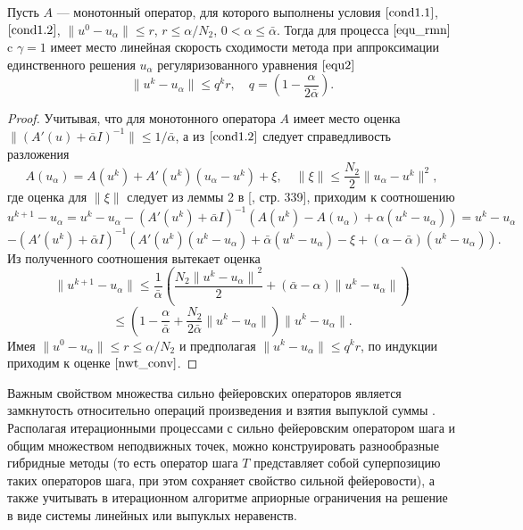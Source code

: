 \begin{theorem}\label{teo2.1} Пусть $A$ --- монотонный оператор, для которого выполнены условия $\eqref{cond1.1}$, $\eqref{cond1.2}$, $\|u^0-u_\alpha\| \le r$, $r\le \alpha/N_2$, $0<\alpha \le \bar\alpha$. Тогда для процесса $\eqref{equ_rmn}$ c $\gamma=1$ имеет место линейная скорость сходимости метода при аппроксимации единственного решения $u_\alpha$ регуляризованного уравнения $\eqref{equ2}$
	\begin{equation}\label{nwt_conv}
	\| u^k-u_\alpha \| \le q^kr, \quad q=(1-\frac{\alpha}{2\bar\alpha}).
	\end{equation}
\end{theorem}
\begin{proof} 
Учитывая, что для монотонного оператора $A$ имеет место оценка $\| (A'(u)+\bar\alpha I)^{-1} \| \le 1/\bar\alpha$, а из $\eqref{cond1.2}$ следует справедливость разложения
$$
A(u_\alpha)=A(u^k)+A'(u^k)(u_\alpha-u^k)+\xi, \quad \|\xi\|\le \frac{N_2}{2}\|u_\alpha-u^k\|^2,
$$
где оценка для $\|\xi\|$ следует из леммы 2 в [\cite{Tre1993}, стр. 339], приходим к соотношению 
$$
u^{k+1}-u_\alpha=u^k-u_\alpha-(A'(u^k)+\bar\alpha I)^{-1}(A(u^k)-A(u_\alpha)+\alpha(u^k-u_\alpha))=u^k- u_\alpha$$ $$-(A'(u^k)+\bar\alpha I)^{-1}(A'(u^k)(u^k-u_\alpha)+\bar\alpha(u^k-u_\alpha)-\xi+(\alpha-\bar\alpha)(u^k-u_\alpha)). $$
Из полученного соотношения вытекает оценка
$$
\|u^{k+1}-u_\alpha\|\le\frac{1}{\bar\alpha}\left(\frac{N_2{\|u^{k}-u_\alpha\|}^2}{2}+(\bar\alpha-\alpha)\|u^k-u_\alpha\|\right)$$
$$\le\left(1-\frac{\alpha}{\bar\alpha}+\frac{N_2}{2\bar\alpha}\|u^k-u_\alpha\|\right)\|u^k-u_\alpha\|.$$
Имея $\|u^0-u_\alpha\|\le r \le \alpha/N_2$ и предполагая $\| u^{k}-u_\alpha \|\le q^kr$, по индукции приходим к оценке $\eqref{nwt_conv}$.
\end{proof}

Важным свойством множества сильно фейеровских операторов является замкнутость относительно операций произведения и взятия выпуклой суммы \cite{Vasin1988}. Располагая итерационными процессами с сильно фейеровским оператором шага и общим множеством неподвижных точек, можно конструировать разнообразные гибридные методы (то есть оператор шага $T$ представляет собой суперпозицию таких операторов шага, при этом сохраняет свойство сильной фейеровости), а также учитывать в итерационном алгоритме априорные ограничения на решение в виде системы линейных или выпуклых неравенств.

